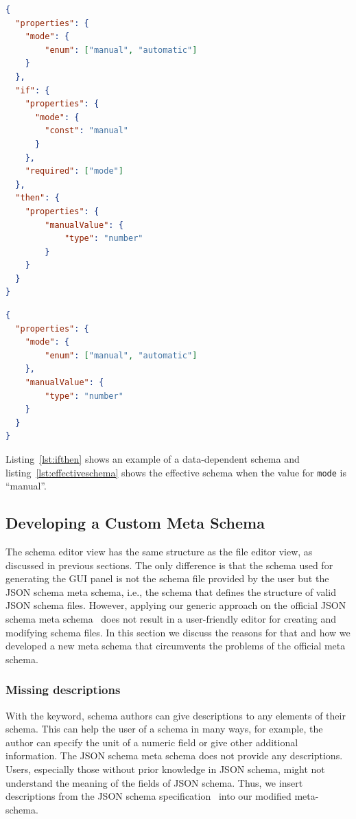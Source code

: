 \begin{lstlisting}[language=json, firstnumber=1, caption=
    {Data dependent schema. If the field \texttt{mode} is set to ``manual'' in the data, users will expect that the GUI shows the \texttt{manualValue} property}, captionpos=b, label={lst:ifthen}]
{
  "properties": {
    "mode": {
        "enum": ["manual", "automatic"]
    }
  },
  "if": {
    "properties": {
      "mode": {
        "const": "manual"
      }
    },
    "required": ["mode"]
  },
  "then": {
    "properties": {
        "manualValue": {
            "type": "number"
        }
    }
  }
}
\end{lstlisting}
\begin{lstlisting}[language=json, firstnumber=1, caption=
    {Effective schema when the value for \texttt{mode} is ``manual''}, captionpos=b, label={lst:effectiveschema}]
{
  "properties": {
    "mode": {
        "enum": ["manual", "automatic"]
    },
    "manualValue": {
        "type": "number"
    }
  }
}
\end{lstlisting}

Listing~\ref{lst:ifthen} shows an example of a data-dependent schema and listing~\ref{lst:effectiveschema} shows
the effective schema when the value for \texttt{mode} is ``manual''.

\subsection{Developing a Custom Meta Schema}\label{subsec:schema-editor}

The schema editor view has the same structure as the file editor view, as discussed in previous sections.
The only difference is that the schema used for generating the GUI panel is not the schema file provided by the user but the JSON schema meta schema,
i.e., the schema that defines the structure of valid JSON schema files.
However, applying our generic approach on the official JSON schema meta schema~\cite{jsonschemaJSONSchema} does not result in a user-friendly editor for
creating and modifying schema files.
In this section we discuss the reasons for that and how we developed a new meta schema that circumvents the problems of the official meta schema.

\subsubsection{Missing descriptions}
With the  keyword, schema authors can give descriptions to any elements of their schema.
This can help the user of a schema in many ways, for example, the author can specify the unit of a numeric field or give other additional information.
The JSON schema meta schema does not provide any descriptions.
Users, especially those without prior knowledge in JSON schema, might not understand the meaning of the fields of JSON schema.
Thus, we insert descriptions from the JSON schema specification~\cite{jsonschemaJSONSchema} into our modified meta-schema.

